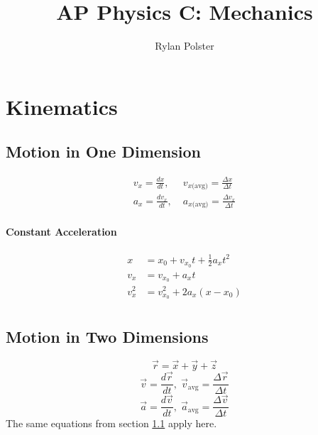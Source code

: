 \documentclass{article}
\title{AP Physics C: Mechanics}
\author{Rylan Polster}
\begin{document}
    \maketitle

    \section{Kinematics}

        \subsection{Motion in One Dimension}
            \label{motion-one-dimension}
            \begin{align}
                v_x = \frac{dx}{dt}, &\; v_{x\text{(avg)}} = \frac{\Delta x}{\Delta t} \\
                a_x = \frac{dv_x}{dt}, &\; a_{x\text{(avg)}} = \frac{\Delta v_x}{\Delta t}
            \end{align}

            \paragraph{Constant Acceleration}
            \begin{align}
                x &= x_0 + v_{x_0} t + \frac{1}{2} a_x t^2 \\
                v_x &= v_{x_0} + a_x t \\
                v_x^2 &= v_{x_0}^2 + 2 a_x \left( x - x_0 \right) \\
            \end{align}

        \subsection{Motion in Two Dimensions}

            \begin{equation}
                \vec{r} = \vec{x} + \vec{y} + \vec{z}
            \end{equation}
            \begin{equation}
                \vec{v} = \frac{d\vec{r}}{dt}, \; \vec{v}_{\text{avg}} = \frac{\Delta \vec{r}}{\Delta t}
            \end{equation}
            \begin{equation}
                \vec{a} = \frac{d\vec{v}}{dt}, \; \vec{a}_{\text{avg}} = \frac{\Delta \vec{v}}{\Delta t}
            \end{equation}
            The same equations from section \ref{motion-one-dimension} apply here.
\end{document}
